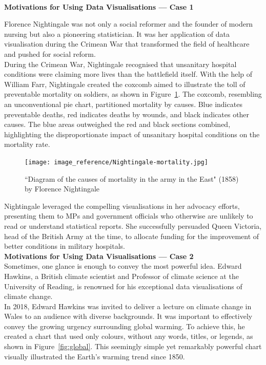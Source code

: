 \documentclass{article}\usepackage[]{graphicx}\usepackage[]{xcolor}
\numberwithin{equation}{section}
\begin{document}
\\\textbf{Motivations for Using Data Visualisations — Case 1}

\noindent
Florence Nightingale was not only a social reformer and the founder of modern nursing but also a pioneering statistician. It was her application of data visualisation during the Crimean War that transformed the field of healthcare and pushed for social reform.\\  

\noindent
During the Crimean War, Nightingale recognised that unsanitary hospital conditions were claiming more lives than the battlefield itself. With the help of William Farr, Nightingale created the coxcomb aimed to illustrate the toll of preventable mortality on soldiers, as shown in Figure~\ref{fig:coxcomb}. The coxcomb, resembling an unconventional pie chart, partitioned mortality by causes. Blue indicates preventable deaths, red indicates deaths by wounds, and black indicates other causes. The blue areas outweighed the red and black sections combined, highlighting the disproportionate impact of unsanitary hospital conditions on the mortality rate.

\begin{figure}[H]
    \centering
    \texttt{[image: image\_reference/Nightingale-mortality.jpg]}
    \caption{``Diagram of the causes of mortality in the army in the East" (1858) by Florence Nightingale \cite{graphFN}}
    \label{fig:coxcomb}
\end{figure}

\noindent
Nightingale leveraged the compelling visualisations in her advocacy efforts, presenting them to MPs and government officials who otherwise are unlikely to read or understand statistical reports. She successfully persuaded Queen Victoria, head of the British Army at the time, to allocate funding for the improvement of better conditions in military hospitals.\\

\noindent
\textbf{Motivations for Using Data Visualisations — Case 2}
\\
\noindent
Sometimes, one glance is enough to convey the most powerful idea. Edward Hawkins, a British climate scientist and Professor of climate science at the University of Reading, is renowned for his exceptional data visualisations of climate change.\\

\noindent
In 2018, Edward Hawkins was invited to deliver a lecture on climate change in Wales to an audience with diverse backgrounds. It was important to effectively convey the growing urgency surrounding global warming. To achieve this, he created a chart that used only colours, without any words, titles, or legends, as shown in Figure~\ref{fig:global}. This seemingly simple yet remarkably powerful chart visually illustrated the Earth's warming trend since 1850.
\end{document}
